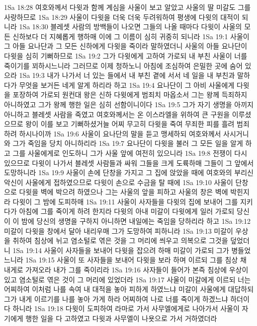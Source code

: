 1Sa 18:28  여호와께서 다윗과 함께 계심을 사울이 보고 알았고 사울의 딸 미갈도 그를 사랑하므로
1Sa 18:29  사울이 다윗을 더욱 더욱 두려워하여 평생에 다윗의 대적이 되니라
1Sa 18:30  블레셋 사람의 방백들이 나오면 그들의 나올 때마다 다윗이 사울의 모든 신하보다 더 지혜롭게 행하매 이에 그 이름이 심히 귀중히 되니라
1Sa 19:1  사울이 그 아들 요나단과 그 모든 신하에게 다윗을 죽이라 말하였더니 사울의 아들 요나단이 다윗을 심히 기뻐하므로
1Sa 19:2  그가 다윗에게 고하여 가로되 내 부친 사울이 너를 죽이기를 꾀하시느니라 그러므로 이제 청하노니 아침에 조심하여 은밀한 곳에 숨어 있으라
1Sa 19:3  내가 나가서 너 있는 들에서 내 부친 곁에 서서 네 일을 내 부친과 말하다가 무엇을 보거든 네게 알게 하리라 하고
1Sa 19:4  요나단이 그 아비 사울에게 다윗을 포장하여 가로되 원컨대 왕은 신하 다윗에게 범죄치 마옵소서 그는 왕께 득죄하지 아니하였고 그가 왕께 행한 일은 심히 선함이니이다
1Sa 19:5  그가 자기 생명을 아끼지 아니하고 블레셋 사람을 죽였고 여호와께서는 온 이스라엘을 위하여 큰 구원을 이루셨으므로 왕이 이를 보고 기뻐하셨거늘 어찌 무고히 다윗을 죽여 무죄한 피를 흘려 범죄하려 하시나이까
1Sa 19:6  사울이 요나단의 말을 듣고 맹세하되 여호와께서 사시거니와 그가 죽임을 당치 아니하리라
1Sa 19:7  요나단이 다윗을 불러 그 모든 일을 알게 하고 그를 사울에게로 인도하니 그가 사울 앞에 여전히 있으니라
1Sa 19:8  전쟁이 다시 있으므로 다윗이 나가서 블레셋 사람들과 싸워 그들을 크게 도륙하매 그들이 그 앞에서 도망하니라
1Sa 19:9  사울이 손에 단창을 가지고 그 집에 앉았을 때에 여호와의 부리신 악신이 사울에게 접하였으므로 다윗이 손으로 수금을 탈 때에
1Sa 19:10  사울이 단창으로 다윗을 벽에 박으려 하였으나 그는 사울의 앞을 피하고 사울의 창은 벽에 박힌지라 다윗이 그 밤에 도피하매
1Sa 19:11  사울이 사자들을 다윗의 집에 보내어 그를 지키다가 아침에 그를 죽이게 하려 한지라 다윗의 아내 미갈이 다윗에게 일러 가로되 당신이 이 밤에 당신의 생명을 구하지 아니하면 내일에는 죽임을 당하리라 하고
1Sa 19:12  미갈이 다윗을 창에서 달아 내리우매 그가 도망하여 피하니라
1Sa 19:13  미갈이 우상을 취하여 침상에 뉘고 염소털로 엮은 것을 그 머리에 씌우고 의복으로 그것을 덮었더니
1Sa 19:14  사울이 사자들을 보내어 다윗을 잡으려 하매 미갈이 가로되 그가 병들었느니라
1Sa 19:15  사울이 또 사자들을 보내어 다윗을 보라 하며 이르되 그를 침상 채 내게로 가져오라 내가 그를 죽이리라
1Sa 19:16  사자들이 들어가 본즉 침상에 우상이 있고 염소털로 엮은 것이 그 머리에 있었더라
1Sa 19:17  사울이 미갈에게 이르되 너는 어찌하여 이처럼 나를 속여 내 대적을 놓아 피하게 하였느냐 미갈이 사울에게 대답하되 그가 내게 이르기를 나를 놓아 가게 하라 어찌하여 나로 너를 죽이게 하겠느냐 하더이다 하니라
1Sa 19:18  다윗이 도피하여 라마로 가서 사무엘에게로 나아가서 사울이 자기에게 행한 일을 다 고하였고 다윗과 사무엘이 나욧으로 가서 거하였더라
